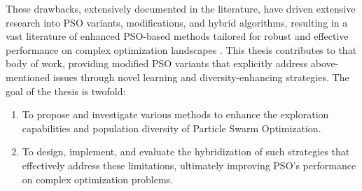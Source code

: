 {These drawbacks, extensively documented in the literature, have driven extensive research into PSO variants, modifications, and hybrid algorithms, resulting in a vast literature of enhanced PSO-based methods tailored for robust and effective performance on complex optimization landscapes \citep[see,][]{thangaraj2011particle,zhang2015comprehensive,sengupta2019particle,jain2022Overview,minku2023introduction,abualigah2025particle,chauhan2025learning,urbanczyk2025sequential}. This thesis contributes to that body of work, providing modified PSO variants that explicitly address above-mentioned issues through novel learning and diversity-enhancing strategies.
The goal of the thesis is twofold: 
\begin{enumerate}
    \item To propose and investigate various methods to enhance the exploration capabilities and population diversity of Particle Swarm Optimization.
    \item To design, implement, and evaluate the hybridization of such strategies that effectively address these limitations, ultimately improving PSO’s performance on complex optimization problems.
\end{enumerate}















}
